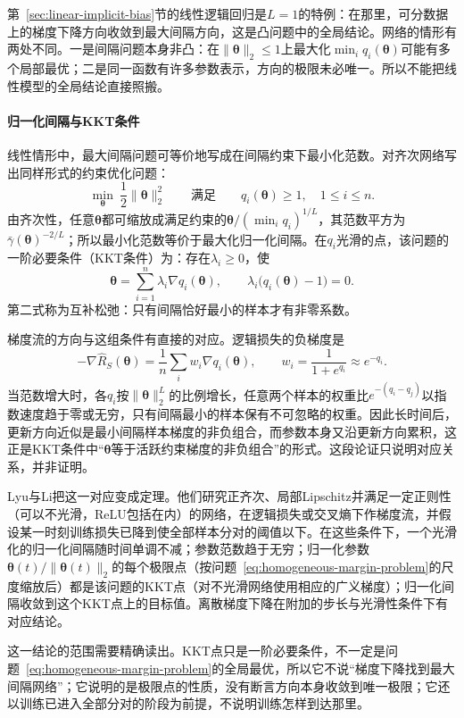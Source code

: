 第~\ref{sec:linear-implicit-bias}节的线性逻辑回归是$L=1$的特例：在那里，可分数据上的梯度下降方向收敛到最大间隔方向，这是凸问题中的全局结论。网络的情形有两处不同。一是间隔问题本身非凸：在$\|\bm\theta\|_2\leq1$上最大化$\min_iq_i(\bm\theta)$可能有多个局部最优；二是同一函数有许多参数表示，方向的极限未必唯一。所以不能把线性模型的全局结论直接照搬。

\paragraph{归一化间隔与KKT条件}

线性情形中，最大间隔问题可等价地写成在间隔约束下最小化范数。对齐次网络写出同样形式的约束优化问题：
\begin{equation}
 \min_{\bm\theta}\ \frac12\|\bm\theta\|_2^2
 \qquad\text{满足}\qquad q_i(\bm\theta)\geq1,\quad1\leq i\leq n.
 \label{eq:homogeneous-margin-problem}
\end{equation}
由齐次性，任意$\bm\theta$都可缩放成满足约束的$\bm\theta/(\min_iq_i)^{1/L}$，其范数平方为$\bar\gamma(\bm\theta)^{-2/L}$；所以最小化范数等价于最大化归一化间隔。在$q_i$光滑的点，该问题的一阶必要条件（KKT条件）为：存在$\lambda_i\geq0$，使
\[
 \bm\theta=\sum_{i=1}^n\lambda_i\nabla q_i(\bm\theta),
 \qquad \lambda_i\bigl(q_i(\bm\theta)-1\bigr)=0.
\]
第二式称为互补松弛：只有间隔恰好最小的样本才有非零系数。

梯度流的方向与这组条件有直接的对应。逻辑损失的负梯度是
\[
 -\nabla\hat R_S(\bm\theta)=\frac1n\sum_iw_i\nabla q_i(\bm\theta),\qquad w_i=\frac1{1+e^{q_i}}\approx e^{-q_i}.
\]
当范数增大时，各$q_i$按$\|\bm\theta\|_2^L$的比例增长，任意两个样本的权重比$e^{-(q_i-q_j)}$以指数速度趋于零或无穷，只有间隔最小的样本保有不可忽略的权重。因此长时间后，更新方向近似是最小间隔样本梯度的非负组合，而参数本身又沿更新方向累积，这正是KKT条件中“$\bm\theta$等于活跃约束梯度的非负组合”的形式。这段论证只说明对应关系，并非证明。

Lyu与Li把这一对应变成定理。他们研究正齐次、局部Lipschitz并满足一定正则性（可以不光滑，ReLU包括在内）的网络，在逻辑损失或交叉熵下作梯度流，并假设某一时刻训练损失已降到使全部样本分对的阈值以下。在这些条件下，一个光滑化的归一化间隔随时间单调不减；参数范数趋于无穷；归一化参数$\bm\theta(t)/\|\bm\theta(t)\|_2$的每个极限点（按问题~\eqref{eq:homogeneous-margin-problem}的尺度缩放后）都是该问题的KKT点（对不光滑网络使用相应的广义梯度）；归一化间隔收敛到这个KKT点上的目标值。离散梯度下降在附加的步长与光滑性条件下有对应结论。

这一结论的范围需要精确读出。KKT点只是一阶必要条件，不一定是问题~\eqref{eq:homogeneous-margin-problem}的全局最优，所以它不说“梯度下降找到最大间隔网络”；它说明的是极限点的性质，没有断言方向本身收敛到唯一极限；它还以训练已进入全部分对的阶段为前提，不说明训练怎样到达那里。

